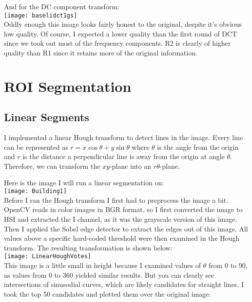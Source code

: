 \documentclass[12pt]{article}
\begin{document}
And for the DC component transform:\\

\texttt{[image: baselidct1gs]}\\

Oddly enough this image looks fairly honest to the original, despite it's
obvious low quality. Of course, I expected a lower quality than the first round
of DCT since we took out most of the frequency components. R2 is clearly of
higher quality than R1 since it retains more of the original information.

\section{ROI Segmentation}

\subsection{Linear Segments}

I implemented a linear Hough transform to detect lines in the image. Every line
can be represented as $r = x\cos{\theta} + y\sin{\theta}$ where $\theta$ is the
angle from the origin and $r$ is the distance a perpendicular line is away from
the origin at angle $\theta$. Therefore, we can transform the $xy$-plane into an
$r\theta$-plane.

Here is the image I will run a linear segmentation on:\\

\texttt{[image: Building1]}\\

Before I ran the Hough transform I first had to preprocess the image a bit.
OpenCV reads in color images in BGR format, so I first converted the image to
HSI and extracted the I channel, as it was the grayscale
version of this image. Then I applied the Sobel edge detector to extract the
edges out of this image. All values above a specific hard-coded threshold were
then examined in the Hough transform. The resulting transformation is shown
below:\\

\texttt{[image: LinearHoughVotes]}\\

This image is a little small in height because I examined values of $\theta$
from $0$ to $90$, as values from $0$ to $360$ yielded similar results. But you
can clearly see intersections of sinusodial curves, which are likely candidates
for straight lines. I took the top 50 candidates and plotted them over the
original image:
\end{document}
